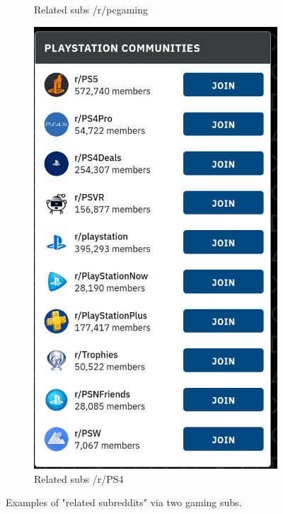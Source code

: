 \documentclass[12pt, a4paper]{article}
\begin{document}
\begin{figure}[ht!]
\begin{subfigure}[b]{0.4\linewidth}
    \caption{Related subs /r/pcgaming}
  \end{subfigure}
  \begin{subfigure}[b]{0.4\linewidth}
    \includegraphics[width=\linewidth]{related_ps4.png}
    \caption{Related subs /r/PS4}
  \end{subfigure}
  \caption{Examples of "related subreddits" via two gaming subs.}
\end{figure}
\end{document}
